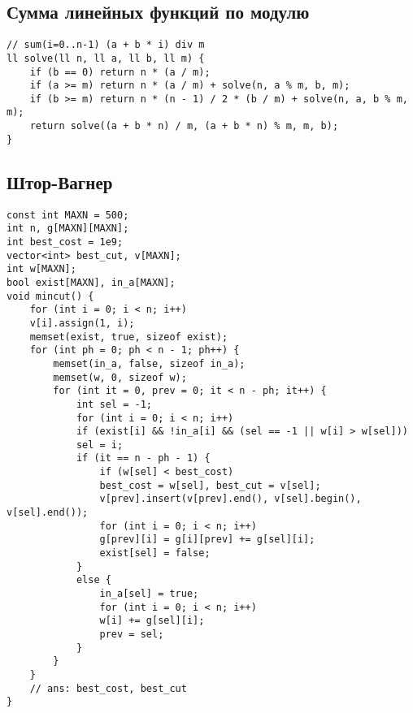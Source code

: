 \documentclass[14pt,fleqn]{article}
\begin{document}
\subsection{Сумма линейных функций по модулю}
\begin{Verbatim}[tabsize=4]
// sum(i=0..n-1) (a + b * i) div m
ll solve(ll n, ll a, ll b, ll m) {
	if (b == 0) return n * (a / m);
	if (a >= m) return n * (a / m) + solve(n, a % m, b, m);
	if (b >= m) return n * (n - 1) / 2 * (b / m) + solve(n, a, b % m, m);
	return solve((a + b * n) / m, (a + b * n) % m, m, b);
}
\end{Verbatim}
\subsection{Штор-Вагнер}
\begin{Verbatim}[tabsize=4]
const int MAXN = 500;
int n, g[MAXN][MAXN];
int best_cost = 1e9;
vector<int> best_cut, v[MAXN];
int w[MAXN];
bool exist[MAXN], in_a[MAXN];
void mincut() {
	for (int i = 0; i < n; i++)
	v[i].assign(1, i);
	memset(exist, true, sizeof exist);
	for (int ph = 0; ph < n - 1; ph++) {
		memset(in_a, false, sizeof in_a);
		memset(w, 0, sizeof w);
		for (int it = 0, prev = 0; it < n - ph; it++) {
			int sel = -1;
			for (int i = 0; i < n; i++)
			if (exist[i] && !in_a[i] && (sel == -1 || w[i] > w[sel]))
			sel = i;
			if (it == n - ph - 1) {
				if (w[sel] < best_cost)
				best_cost = w[sel], best_cut = v[sel];
				v[prev].insert(v[prev].end(), v[sel].begin(), v[sel].end());
				for (int i = 0; i < n; i++)
				g[prev][i] = g[i][prev] += g[sel][i];
				exist[sel] = false;
			}
			else {
				in_a[sel] = true;
				for (int i = 0; i < n; i++)
				w[i] += g[sel][i];
				prev = sel;
			}
		}
	}
	// ans: best_cost, best_cut
}
\end{Verbatim}
\end{document}
